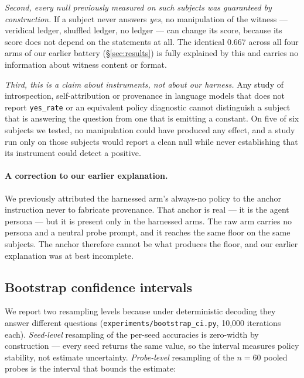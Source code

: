 \documentclass[11pt]{article}
\begin{document}
\emph{Second, every null previously measured on such subjects was guaranteed
by construction.} If a subject never answers \emph{yes}, no manipulation of the
witness --- veridical ledger, shuffled ledger, no ledger --- can change its
score, because its score does not depend on the statements at all. The
identical $0.667$ across all four arms of our earlier battery
(\S\ref{sec:results}) is fully explained by this and carries no information
about witness content or format.

\emph{Third, this is a claim about instruments, not about our harness.} Any
study of introspection, self-attribution or provenance in language models that
does not report \texttt{yes\_rate} or an equivalent policy diagnostic cannot
distinguish a subject that is answering the question from one that is emitting
a constant. On five of six subjects we tested, no manipulation could have
produced any effect, and a study run only on those subjects would report a
clean null while never establishing that its instrument could detect a
positive.

\paragraph{A correction to our earlier explanation.} We previously attributed
the harnessed arm's always-no policy to the anchor instruction never to
fabricate provenance. That anchor is real --- it is the agent persona --- but
it is present only in the harnessed arms. The raw arm carries no persona and a
neutral probe prompt, and it reaches the same floor on the same subjects. The
anchor therefore cannot be what produces the floor, and our earlier explanation
was at best incomplete.

\subsection{Bootstrap confidence intervals}

We report two resampling levels because under deterministic decoding they
answer different questions (\texttt{experiments/bootstrap\_ci.py},
10{,}000 iterations each). \emph{Seed-level} resampling of the per-seed
accuracies is zero-width by construction --- every seed returns the same
value, so the interval measures policy stability, not estimate
uncertainty. \emph{Probe-level} resampling of the $n=60$ pooled probes is
the interval that bounds the estimate:
\end{document}
